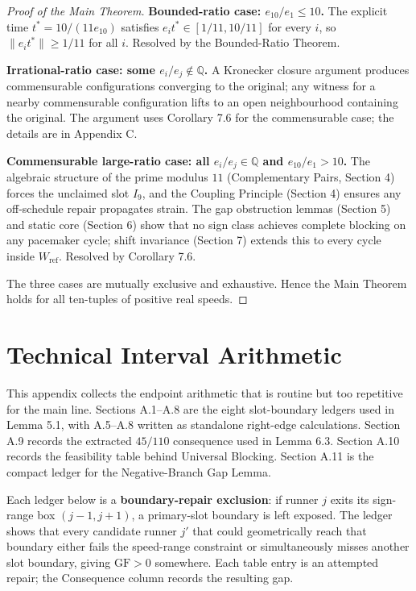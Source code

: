 \documentclass[12pt]{article}
\begin{document}
\begin{proof}[Proof of the Main Theorem]

\textbf{Bounded-ratio case: $e_{10}/e_1\le 10$.}
The explicit time $t^*=10/(11e_{10})$ satisfies $e_it^*\in[1/11,10/11]$ for every $i$,
so $\|e_it^*\|\ge 1/11$ for all $i$. Resolved by the Bounded-Ratio Theorem.

\textbf{Irrational-ratio case: some $e_i/e_j\notin\mathbb{Q}$.}
A Kronecker closure argument produces commensurable configurations converging to the
original; any witness for a nearby commensurable configuration lifts to an open
neighbourhood containing the original. The argument uses Corollary 7.6 for the
commensurable case; the details are in Appendix C.

\textbf{Commensurable large-ratio case: all $e_i/e_j\in\mathbb{Q}$ and $e_{10}/e_1>10$.}
The algebraic structure of the prime modulus $11$ (Complementary Pairs, Section 4) forces
the unclaimed slot $I_9$, and the Coupling Principle (Section 4) ensures any off-schedule
repair propagates strain. The gap obstruction lemmas (Section 5) and static core (Section 6)
show that no sign class achieves complete blocking on any pacemaker cycle; shift invariance
(Section 7) extends this to every cycle inside $W_{\mathrm{ref}}$. Resolved by Corollary 7.6.

The three cases are mutually exclusive and exhaustive. Hence the Main Theorem holds for
all ten-tuples of positive real speeds.
\end{proof}






\appendix
\section{Technical Interval Arithmetic}

This appendix collects the endpoint arithmetic that is routine but too repetitive for the
main line. Sections A.1--A.8 are the eight slot-boundary ledgers used in Lemma 5.1, with
A.5--A.8 written as standalone right-edge calculations. Section A.9 records the extracted
$45/110$ consequence used in Lemma 6.3. Section A.10 records the feasibility table behind
Universal Blocking. Section A.11 is the compact ledger for the Negative-Branch Gap Lemma.

Each ledger below is a \textbf{boundary-repair exclusion}: if runner $j$ exits its sign-range
box $(j-1,j+1)$, a primary-slot boundary is left exposed. The ledger shows that every
candidate runner $j'$ that could geometrically reach that boundary either fails the
speed-range constraint or simultaneously misses another slot boundary, giving
$\mathrm{GF}>0$ somewhere. Each table entry is an attempted repair; the Consequence column
records the resulting gap.
\end{document}
